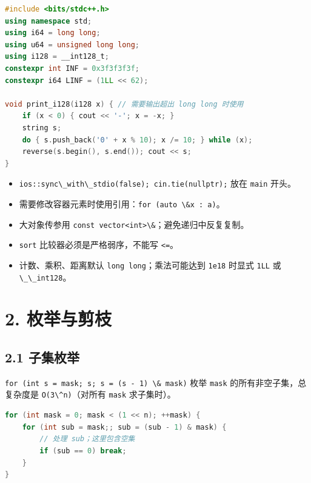 \begin{lstlisting}[language={C++}]
#include <bits/stdc++.h>
using namespace std;
using i64 = long long;
using u64 = unsigned long long;
using i128 = __int128_t;
constexpr int INF = 0x3f3f3f3f;
constexpr i64 LINF = (1LL << 62);

void print_i128(i128 x) { // 需要输出超出 long long 时使用
    if (x < 0) { cout << '-'; x = -x; }
    string s;
    do { s.push_back('0' + x % 10); x /= 10; } while (x);
    reverse(s.begin(), s.end()); cout << s;
}
\end{lstlisting}

\begin{itemize}
\tightlist
\item
  \passthrough{\lstinline!ios::sync\_with\_stdio(false); cin.tie(nullptr);!} 放在 \passthrough{\lstinline!main!} 开头。
\item
  需要修改容器元素时使用引用：\passthrough{\lstinline!for (auto \&x : a)!}。
\item
  大对象传参用 \passthrough{\lstinline!const vector<int>\&!}；避免递归中反复复制。
\item
  \passthrough{\lstinline!sort!} 比较器必须是严格弱序，不能写 \passthrough{\lstinline!<=!}。
\item
  计数、乘积、距离默认 \passthrough{\lstinline!long long!}；乘法可能达到 \passthrough{\lstinline!1e18!} 时显式 \passthrough{\lstinline!1LL!} 或 \passthrough{\lstinline!\_\_int128!}。
\end{itemize}

\section{2. 枚举与剪枝}\label{ux679aux4e3eux4e0eux526aux679d}

\subsection{2.1 子集枚举}\label{ux5b50ux96c6ux679aux4e3e}

\passthrough{\lstinline!for (int s = mask; s; s = (s - 1) \& mask)!} 枚举 \passthrough{\lstinline!mask!} 的所有非空子集，总复杂度是 \passthrough{\lstinline!O(3\^n)!}（对所有 \passthrough{\lstinline!mask!} 求子集时）。

\begin{lstlisting}[language={C++}]
for (int mask = 0; mask < (1 << n); ++mask) {
    for (int sub = mask;; sub = (sub - 1) & mask) {
        // 处理 sub；这里包含空集
        if (sub == 0) break;
    }
}
\end{lstlisting}

